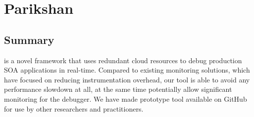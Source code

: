 \chapter{Parikshan}
\label{ch:parikshan}







\section{Summary}
\label{sec:parikshanSummary}

\parikshan is a novel framework that uses redundant cloud resources to debug production SOA applications in real-time.
Compared to existing monitoring solutions, which have focused on reducing instrumentation overhead, our tool is able to avoid any performance slowdown at all, at the same time potentially allow significant monitoring for the debugger.
We have made \parikshan prototype tool available on GitHub for use by other researchers and practitioners.






